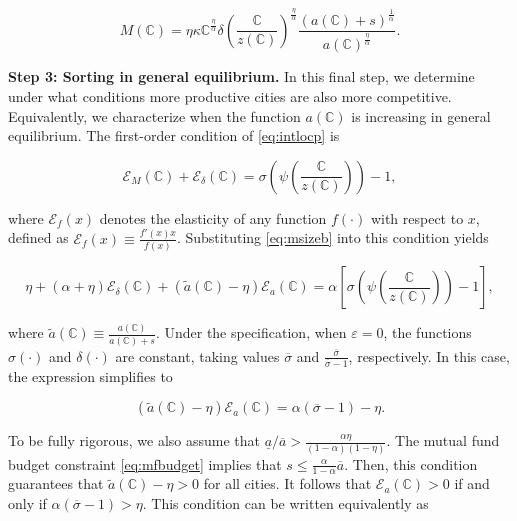 \begin{equation}\label{eq:msizeb}
	M({\mathbb{C}}) = \eta \kappa \mathbb{C}^{\frac{\eta}{\alpha}} \delta \left(\frac{\mathbb{C}}{z({\mathbb{C}})}\right)^{\frac{\eta}{\alpha}} \frac{(a(\mathbb{C}) + s)^{\frac{1}{\alpha}}}{a(\mathbb{C})^\frac{\eta}{\alpha}}.
\end{equation}

\noindent \textbf{Step 3: Sorting in general equilibrium.}
In this final step, we determine under what conditions more productive cities are also more competitive. Equivalently, we characterize when the function $a(\mathbb{C})$ is increasing in general equilibrium. The first-order condition of \eqref{eq:intlocp} is

\begin{equation*}
\mathcal{E}_{M}(\mathbb{C}) + \mathcal{E}_\delta(\mathbb{C}) = \sigma\left(\psi\left(\frac{{\mathbb{C}}}{z(\mathbb{C})}\right)\right) - 1,
\end{equation*}

where $\mathcal{E}_f(x)$ denotes the elasticity of any function $f(\cdot)$ with respect to $x$, defined as
$\mathcal{E}_f(x) \equiv \frac{f'(x) x}{f(x)}$. Substituting \eqref{eq:msizeb} into this condition yields

\begin{equation*}
\eta + (\alpha + \eta) \mathcal{E}_\delta(\mathbb{C}) + (\widetilde{a}(\mathbb{C})-\eta) \mathcal{E}_a(\mathbb{C}) = \alpha\left[\sigma\left(\psi\left(\frac{{\mathbb{C}}}{z(\mathbb{C})}\right)\right) - 1\right],
\end{equation*}

where $\widetilde{a}(\mathbb{C}) \equiv \frac{a(\mathbb{C})}{a(\mathbb{C}) + s}$. Under the \textcite{Klenow&Willis16} specification, when $\varepsilon = 0$, the functions $\sigma(\cdot)$ and $\delta(\cdot)$ are constant, taking values $\overline{\sigma}$ and $\frac{\overline{\sigma}}{\overline{\sigma} - 1}$, respectively. In this case, the expression simplifies to

\begin{equation*}
(\widetilde{a}(\mathbb{C})-\eta) \mathcal{E}_a(\mathbb{C}) = \alpha\left(\overline{\sigma} - 1\right) - \eta.
\end{equation*}

To be fully rigorous, we also assume that $\underline{a}/\overline{a} > \frac{\alpha \eta}{(1-\alpha)(1-\eta)}$. The mutual fund budget constraint \eqref{eq:mfbudget} implies that $s \leq \frac{\alpha}{1-\alpha} \overline{a}$. Then, this condition guarantees that $\widetilde{a}(\mathbb{C}) - \eta > 0$ for all cities. It follows that $\mathcal{E}_a(\mathbb{C}) > 0$ if and only if
$\alpha\left(\overline{\sigma} - 1\right) > \eta$. This condition can be written equivalently as

